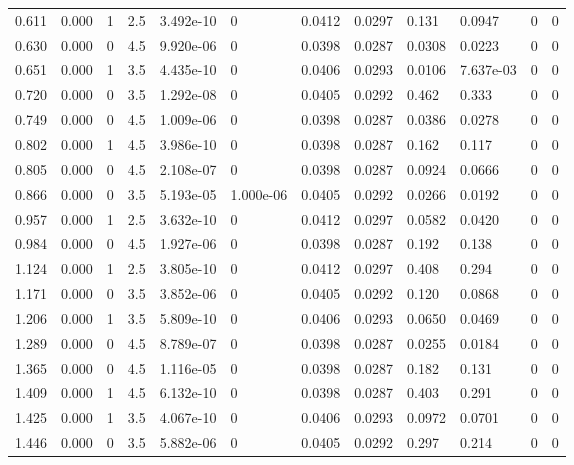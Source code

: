 \documentclass[preview]{standalone}
\begin{document}
{{\begin{tabular}{L{1.2cm}C{1.2cm} C{0.3cm}C{0.5cm} C{1.4cm}C{1.4cm} C{1.4cm}C{1.4cm} C{1.6cm}C{1.6cm} C{1.6cm}C{1.6cm}}
  0.611  &  0.000  & 1     & 2.5 &  3.492e-10  & 0  &  0.0412&   0.0297& 0.131 & 0.0947   &  0 & 0  \\ 
  0.630  &  0.000  & 0     & 4.5 &  9.920e-06  & 0  &  0.0398&   0.0287& 0.0308 & 0.0223   &  0 & 0  \\ 
  0.651  &  0.000  & 1     & 3.5 &  4.435e-10  & 0  &  0.0406&   0.0293& 0.0106 & 7.637e-03   &  0 & 0  \\ 
  0.720  &  0.000  & 0     & 3.5 &  1.292e-08  & 0  &  0.0405&   0.0292& 0.462 & 0.333   &  0 & 0  \\ 
  0.749  &  0.000  & 0     & 4.5 &  1.009e-06  & 0  &  0.0398&   0.0287& 0.0386 & 0.0278   &  0 & 0  \\ 
  0.802  &  0.000  & 1     & 4.5 &  3.986e-10  & 0  &  0.0398&   0.0287& 0.162 & 0.117   &  0 & 0  \\ 
  0.805  &  0.000  & 0     & 4.5 &  2.108e-07  & 0  &  0.0398&   0.0287& 0.0924 & 0.0666   &  0 & 0  \\ 
  0.866  &  0.000  & 0     & 3.5 &  5.193e-05  & 1.000e-06  &  0.0405&   0.0292& 0.0266 & 0.0192   &  0 & 0  \\ 
  0.957  &  0.000  & 1     & 2.5 &  3.632e-10  & 0  &  0.0412&   0.0297& 0.0582 & 0.0420   &  0 & 0  \\ 
  0.984  &  0.000  & 0     & 4.5 &  1.927e-06  & 0  &  0.0398&   0.0287& 0.192 & 0.138   &  0 & 0  \\ 
  1.124  &  0.000  & 1     & 2.5 &  3.805e-10  & 0  &  0.0412&   0.0297& 0.408 & 0.294   &  0 & 0  \\ 
  1.171  &  0.000  & 0     & 3.5 &  3.852e-06  & 0  &  0.0405&   0.0292& 0.120 & 0.0868   &  0 & 0  \\ 
  1.206  &  0.000  & 1     & 3.5 &  5.809e-10  & 0  &  0.0406&   0.0293& 0.0650 & 0.0469   &  0 & 0  \\ 
  1.289  &  0.000  & 0     & 4.5 &  8.789e-07  & 0  &  0.0398&   0.0287& 0.0255 & 0.0184   &  0 & 0  \\ 
  1.365  &  0.000  & 0     & 4.5 &  1.116e-05  & 0  &  0.0398&   0.0287& 0.182 & 0.131   &  0 & 0  \\ 
  1.409  &  0.000  & 1     & 4.5 &  6.132e-10  & 0  &  0.0398&   0.0287& 0.403 & 0.291   &  0 & 0  \\ 
  1.425  &  0.000  & 1     & 3.5 &  4.067e-10  & 0  &  0.0406&   0.0293& 0.0972 & 0.0701   &  0 & 0  \\ 
  1.446  &  0.000  & 0     & 3.5 &  5.882e-06  & 0  &  0.0405&   0.0292& 0.297 & 0.214   &  0 & 0  \\ 

\end{tabular}}}
\end{document}
